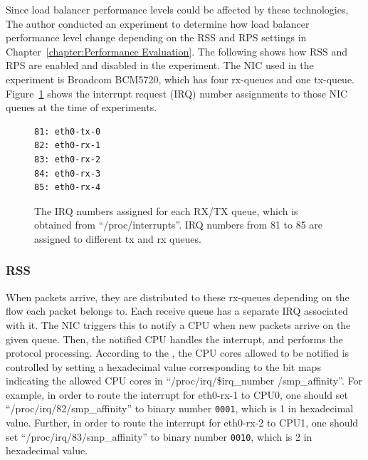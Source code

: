 Since load balancer performance levels could be affected by these technologies,
The author conducted an experiment to determine how load balancer performance level change depending on the RSS and RPS settings in Chapter~\ref{chapter:Performance Evaluation}.
The following shows how RSS and RPS are enabled and disabled in the experiment. 
The NIC used in the experiment is Broadcom BCM5720, which has four rx-queues and one tx-queue.
Figure~\ref{fig:rx-queue} shows the interrupt request (IRQ) number assignments to those NIC queues at the time of experiments.

\begin{figure}[h]
\centering
\begin{minipage}{0.3\columnwidth}
\begin{verbatim}
81: eth0-tx-0
82: eth0-rx-1
83: eth0-rx-2
84: eth0-rx-3
85: eth0-rx-4
\end{verbatim}
\end{minipage}

\par\bigskip
\centering
\begin{minipage}{0.9\columnwidth}
  \caption[The IRQ numbers assigned for each RX/TX queue]{
    The IRQ numbers assigned for each RX/TX queue, which is obtained from \enquote{/proc/interrupts}.
    IRQ numbers from 81 to 85 are assigned to different tx and rx queues.
  }
  \label{fig:rx-queue}
\end{minipage}

\end{figure}

\subsubsection{RSS}

When packets arrive, they are distributed to these rx-queues depending on the flow each packet belongs to.
Each receive queue has a separate IRQ associated with it. The NIC triggers
this to notify a CPU when new packets arrive on the given queue.
Then, the notified CPU handles the interrupt, and performs the protocol processing. 
According to the \cite{TomHerbert}, the CPU cores allowed to be notified is controlled by setting 
a hexadecimal value corresponding to the bit maps indicating the allowed CPU cores in \enquote{/proc/irq/\$irq\_number /smp\_affinity}.
%
For example, in order to route the interrupt for eth0-rx-1 to CPU0, 
one should set \enquote{/proc/irq/82/smp\_affinity} 
to binary number {\tt 0001}, which is 1 in hexadecimal value.
Further, in order to route the interrupt for eth0-rx-2 to CPU1, one 
should set \enquote{/proc/irq/83/smp\_affinity} 
to binary number {\tt 0010}, which is 2 in hexadecimal value.

